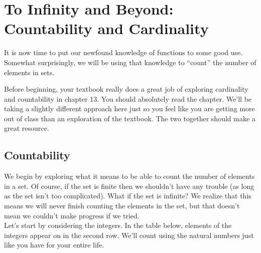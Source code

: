 \chapter[Countability \& Cardinality]{To Infinity and Beyond: Countability and Cardinality}

It is now time to put our newfound knowledge of functions to some good use.  Somewhat surprisingly, we will be using that knowledge to ``count'' the number of elements in sets.

\begin{center}
\end{center}


Before beginning, your textbook really does a great job of exploring cardinality and countability in chapter 13.  You should absolutely read the chapter.  We'll be taking a slightly different approach here just so you feel like you are getting more out of class than an exploration of the textbook.  The two together should make a great resource.

\section{Countability}

We begin by exploring what it means to be able to count the number of elements in a set.  Of course, if the set is finite then we shouldn't have any trouble (as long as the set isn't too complicated).  What if the set is infinite?  We realize that this means we will never finish counting the elements in the set, but that doesn't mean we couldn't make progress if we tried.\\

Let's start by considering the integers.  In the table below, elements of the integers appear on in the second row.  We'll count using the natural numbers just like you have for your entire life.

